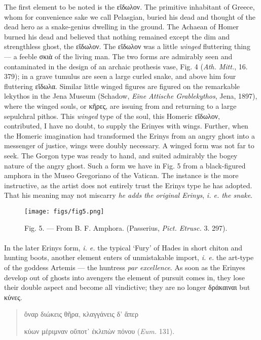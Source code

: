 \documentclass[a4paper, 11pt, oneside, polutonikogreek, english]{article}
\begin{document}
The first element to be noted is the εἴδωλον. The primitive inhabitant of Greece, whom for convenience sake we call Pelasgian, buried his dead and thought of the dead hero as a snake-genius dwelling in the ground. The Achaean of Homer burned his dead and believed that nothing remained except the dim and strengthless ghost, the εἴδωλον. The εἴδωλον was a little \emph{winged} fluttering thing --- a feeble σκιὰ of the living man. The two forms are admirably seen and contaminated in the design of an archaic prothesis vase, Fig. 4 (\emph{Ath. Mitt.}, 16. 379); in a grave tumulus are seen a large curled snake, and above him four fluttering εἴδωλα. Similar little winged figures are figured on the remarkable lekythos in the Jena Museum (Schadow, \emph{Eine Attische Grablekythos}, Jena, 1897), where the winged souls, or κῆρες, are issuing from and returning to a large sepulchral pithos. This \emph{winged} type of the soul, this Homeric εἴδωλον, contributed, I have no doubt, to supply the Erinyes with wings. Further, when the Homeric imagination had transformed the Erinys from an angry ghost into a messenger of justice, wings were doubly necessary. A winged form was not far to seek. The Gorgon type was ready to hand, and suited admirably the bogey nature of the angry ghost. Such a form we have in Fig. 5 from a black-figured amphora in the Museo Gregoriano of the Vatican. The instance is the more instructive, as the artist does not entirely trust the Erinys type he has adopted. That his meaning may not miscarry \emph{he adds the original Erinys}, \emph{i. e. the snake}.
\begin{figure}[H]
\centering
\texttt{[image: figs/fig5.png]}
\caption{\Fontauri Fig. 5. --- From B. F. Amphora. (Passerius, \emph{Pict. Etrusc.} 3. 297).}
\end{figure}
\paragraph{}
In the later Erinys form, \emph{i. e.} the typical `Fury' of Hades in short chiton and hunting boots, another element enters of unmistakable import, \emph{i. e.} the art-type of the goddess Artemis --- the huntress \emph{par excellence}. As soon as the Erinyes develop out of ghosts into avengers the element of pursuit comes in, they lose their double aspect and become all vindictive; they are no longer δράκαιναι but κύνες.
\begin{quotation}
ὄναρ διώκεις θῆρα, κλαγγάνεις δ' ἅπερ

κύων μέριμναν οὔποτ᾽ ἐκλιπὼν πόνου (\emph{Eum.} 131).
\end{quotation}
\end{document}
